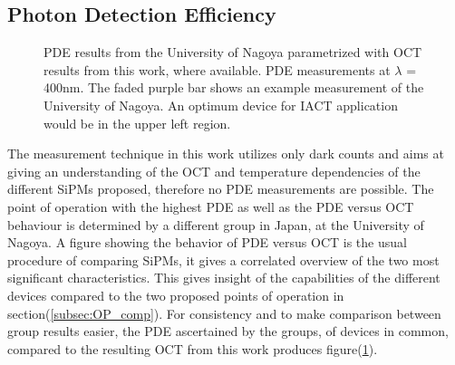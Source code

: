 \documentclass[12pt,article,type=msc,colorback,accentcolor=tud9c]{tudthesis}
\begin{document}
\subsection{Photon Detection Efficiency}
\begin{figure}[h!]
\begin{centering}
\caption[PDE versus OCT comparison]{PDE results from the University of Nagoya parametrized with OCT results from this work, where available. PDE measurements at $\lambda$ = 400nm. The faded purple bar shows an example measurement of the University of Nagoya. An optimum device for IACT application would be in the upper left region.}
\label{fig:Nagoya_PDE_me_OCT}
\end{centering}
\end{figure}
The measurement technique in this work utilizes only dark counts and aims at giving an understanding of the OCT and temperature dependencies of the different SiPMs proposed, therefore no PDE measurements are possible. The point of operation with the highest PDE as well as the PDE versus OCT behaviour is determined by a different group in Japan, at the University of Nagoya. A figure showing the behavior of PDE versus OCT is the usual procedure of comparing SiPMs, it gives a correlated overview of the two most significant characteristics. This gives insight of the capabilities of the different devices compared to the two proposed points of operation in section(\ref{subsec:OP_comp}). For consistency and to make comparison between group results easier, the PDE ascertained by the groups, of devices in common, compared to the resulting OCT from this work produces figure(\ref{fig:Nagoya_PDE_me_OCT}).\\
\end{document}
